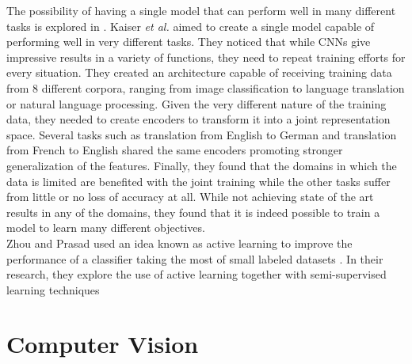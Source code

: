 The possibility of having a single model that can perform well in many different tasks is explored in \cite{DBLP:journals/corr/KaiserGSVPJU17}. Kaiser \textit{et al.} aimed to create a single model capable of performing well in very different tasks. They noticed that while CNNs give impressive results in a variety of functions, they need to repeat training efforts for every situation. They created an architecture capable of receiving training data from 8 different corpora, ranging from image classification to language translation or natural language processing. Given the very different nature of the training data, they needed to create encoders to transform it into a joint representation space. Several tasks such as translation from English to German and translation from French to English shared the same encoders promoting stronger generalization of the features. Finally, they found that the domains in which the data is limited are benefited with the joint training while the other tasks suffer from little or no loss of accuracy at all. While not achieving state of the art results in any of the domains, they found that it is indeed possible to train a model to learn many different objectives. \\


Zhou and Prasad used an idea known as active learning to improve the performance of a classifier taking the most of small labeled datasets \cite{7956153}. In their research, they explore the use of active learning together with semi-supervised learning techniques\\


\section{Computer Vision}


